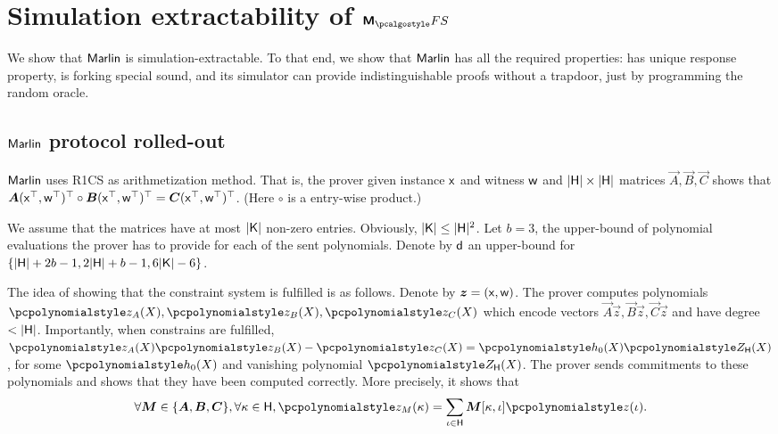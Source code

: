 
\section{Simulation extractability of $\marlinprotfs$}
We show that ${\textnormal{\textsf{Marlin}}}$ is simulation-extractable. To that end, we show
that ${\textnormal{\textsf{Marlin}}}$ has all the required properties: has unique response property, is
forking special sound, and its simulator can provide indistinguishable proofs
without a trapdoor, just by programming the random oracle.

\subsection{${\textnormal{\textsf{Marlin}}}$ protocol rolled-out}
${\textnormal{\textsf{Marlin}}}$ uses R1CS as arithmetization method. That is, the prover given
instance $\mathsf{x}$ and witness $\mathsf{w}$ and $|\mathsf{H}| \times |\mathsf{H}|$ matrices $\vec{A},
\vec{B}, \vec{C}$ shows that $\vec{A} (\inp^\top, \wit^\top)^\top \circ \vec{B}
(\inp^\top, \wit^\top)^\top = \vec{C} (\inp^\top, \wit^\top)^\top$. (Here
$\circ$ is a entry-wise product.)

We assume that the matrices have at most $|\mathsf{K}|$ non-zero entries. Obviously,
$|\mathsf{K}| \leq |\mathsf{H}|^2$. Let $b = 3$, the upper-bound of polynomial evaluations
the prover has to provide for each of the sent polynomials.  Denote by $\mathsf{d}$
an upper-bound for $\{|\mathsf{H}| + 2b -1, 2 |\mathsf{H}| + b - 1, 6 |\mathsf{K}| - 6\}$.

The idea of showing that the constraint system is fulfilled is as
follows. Denote by $\vec{z} = (\inp, \wit)$. The prover computes polynomials
$\p{z_A} (X), \p{z_B} (X), \p{z_C} (X)$ which encode vectors
$\vec{A} \vec{z}, \vec{B} \vec{z}, \vec{C} \vec{z}$ and have degree $<
|\mathsf{H}|$. Importantly, when constrains are fulfilled,
$ \p{z_A} (X) \p{z_B} (X) - \p{z_C} (X) = \p{h_0} (X) \ZERO_\HHH (X)$, for some
$\p{h_0} (X)$ and vanishing polynomial $\ZERO_\HHH (X)$. The prover sends
commitments to these polynomials and shows that they have been computed
correctly. More precisely, it shows that
\begin{equation}
  \label{eq:marlin_eq_2}
\forall \vec{M} \in \smallset{\vec{A}, \vec{B}, \vec{C}},  \forall \kappa \in \HHH,
\p{z_M} (\kappa) = \sum_{\iota \in \HHH} \vec{M}[\kappa, \iota] \p{z}(\iota).
\end{equation}

